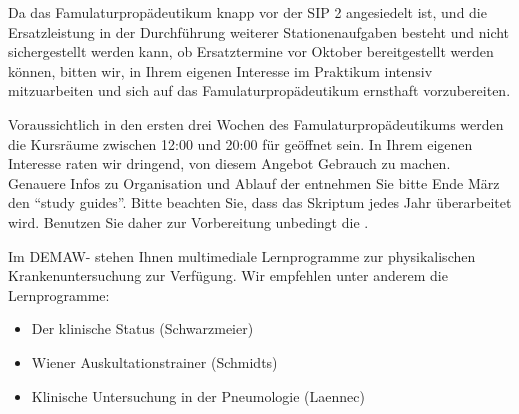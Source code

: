 {%
Da das Famulaturpropädeutikum knapp vor der SIP 2
angesiedelt ist, und die Ersatzleistung in der Durchführung
weiterer Stationenaufgaben besteht und nicht sichergestellt
werden kann, ob Ersatztermine vor Oktober bereitgestellt
werden können, bitten wir, in Ihrem eigenen Interesse im
Praktikum intensiv mitzuarbeiten und sich auf das
Famulaturpropädeutikum ernsthaft vorzubereiten.

Voraussichtlich in den ersten drei Wochen des
Famulaturpropädeutikums werden die Kursräume  zwischen 12:00 und 20:00 für
 geöffnet sein. In Ihrem eigenen
Interesse raten wir dringend, von diesem Angebot Gebrauch zu machen. Genauere Infos zu Organisation und
Ablauf der  entnehmen Sie bitte Ende
März den \enquote{study guides}.
Bitte beachten Sie, dass das Skriptum jedes Jahr
überarbeitet wird. Benutzen Sie daher zur Vorbereitung
unbedingt die .}
{}
{}
{}
{}




{Im DEMAW- stehen Ihnen multimediale
Lernprogramme zur physikalischen Krankenuntersuchung zur Verfügung.
Wir empfehlen unter anderem die Lernprogramme:

\begin{itemize}
  \item Der klinische Status (Schwarzmeier)
  \item Wiener Auskultationstrainer (Schmidts)
  \item Klinische Untersuchung in der Pneumologie (Laennec)
\end{itemize}
% 
% 
}{}{}{}{}

\begin{Literary}


\end{Literary}








